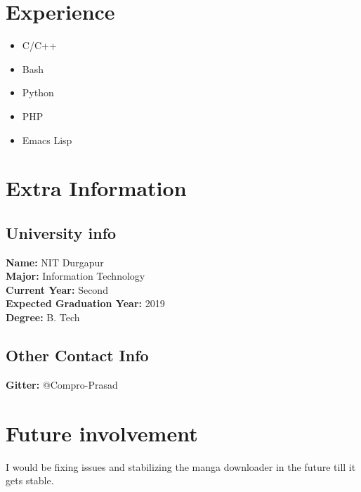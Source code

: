 \documentclass[11pt]{article}
\begin{document}
\section{Experience}
\label{sec:orgec44737}
\begin{itemize}
\item C/C++
\item Bash
\item Python
\item PHP
\item Emacs Lisp
\end{itemize}

\section{Extra Information}
\label{sec:org40f59d4}

\subsection{University info}
\label{sec:orgbce01dd}
\textbf{Name:} NIT Durgapur\\
\textbf{Major:} Information Technology\\
\textbf{Current Year:} Second\\
\textbf{Expected Graduation Year:} 2019\\
\textbf{Degree:} B. Tech\\

\subsection{Other Contact Info}
\label{sec:orgb7c9f07}
\textbf{Gitter:} @Compro-Prasad

\section{Future involvement}
\label{sec:orgf9e2a84}
I would be fixing issues and stabilizing the manga downloader in the future
till it gets stable.
\end{document}
